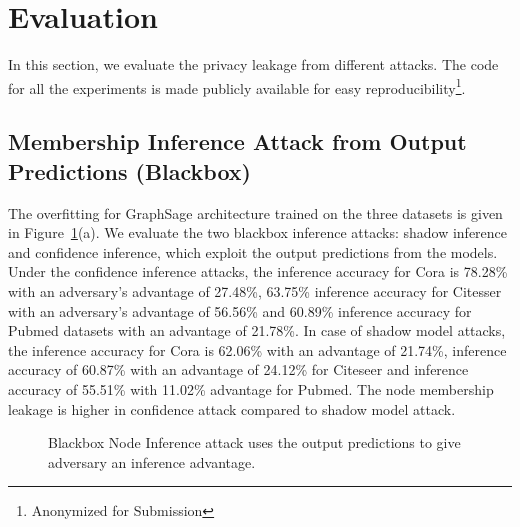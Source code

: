 \section{Evaluation}\label{evaluation}

In this section, we evaluate the privacy leakage from different attacks.
The code for all the experiments is made publicly available for easy reproducibility\footnote{Anonymized for Submission}.

\subsection{Membership Inference Attack from Output Predictions (Blackbox)}


The overfitting for GraphSage architecture trained on the three datasets is given in Figure~\ref{fig:NIA}(a).
We evaluate the two blackbox inference attacks: shadow inference and confidence inference, which exploit the output predictions from the models.
Under the confidence inference attacks, the inference accuracy for Cora is 78.28\% with an adversary's advantage of 27.48\%, 63.75\% inference accuracy for Citesser with an adversary's advantage of 56.56\% and 60.89\% inference accuracy for Pubmed datasets with an advantage of 21.78\%.
In case of shadow model attacks, the inference accuracy for Cora is 62.06\% with an advantage of 21.74\%, inference accuracy of 60.87\% with an advantage of 24.12\% for Citeseer and inference accuracy of 55.51\% with 11.02\% advantage for Pubmed.
The node membership leakage is higher in confidence attack compared to shadow model attack.


\begin{figure}[!htb]
    \centering
    \begin{minipage}[b]{1\linewidth}
    \centering
    \end{minipage}
    \caption{Blackbox Node Inference attack uses the output predictions to give adversary an inference advantage.}
    \label{fig:NIA}
\end{figure}




